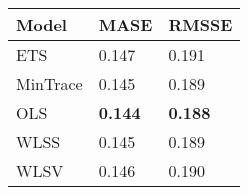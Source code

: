 
\begin{tabular}{lll}

Model & MASE & RMSSE\\
\midrule
ETS & 0.147 & 0.191\\
MinTrace & 0.145 & 0.189\\
OLS & \textbf{0.144} & \textbf{0.188}\\
WLSS & 0.145 & 0.189\\
WLSV & 0.146 & 0.190\\

\end{tabular}